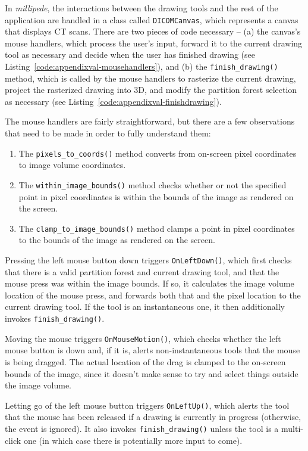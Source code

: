 In \emph{millipede}, the interactions between the drawing tools and the rest of the application are handled in a class called \texttt{DICOMCanvas}, which represents a canvas that displays CT scans. There are two pieces of code necessary -- (a) the canvas's mouse handlers, which process the user's input, forward it to the current drawing tool as necessary and decide when the user has finished drawing (see Listing~\ref{code:appendixval-mousehandlers}), and (b) the \texttt{finish_drawing()} method, which is called by the mouse handlers to rasterize the current drawing, project the rasterized drawing into 3D, and modify the partition forest selection as necessary (see Listing~\ref{code:appendixval-finishdrawing}).

The mouse handlers are fairly straightforward, but there are a few observations that need to be made in order to fully understand them:
%
\begin{enumerate}

\item The \texttt{pixels_to_coords()} method converts from on-screen pixel coordinates to image volume coordinates.
\item The \texttt{within_image_bounds()} method checks whether or not the specified point in pixel coordinates is within the bounds of the image as rendered on the screen.
\item The \texttt{clamp_to_image_bounds()} method clamps a point in pixel coordinates to the bounds of the image as rendered on the screen.

\end{enumerate}
%
Pressing the left mouse button down triggers \texttt{OnLeftDown()}, which first checks that there is a valid partition forest and current drawing tool, and that the mouse press was within the image bounds. If so, it calculates the image volume location of the mouse press, and forwards both that and the pixel location to the current drawing tool. If the tool is an instantaneous one, it then additionally invokes \texttt{finish_drawing()}.

Moving the mouse triggers \texttt{OnMouseMotion()}, which checks whether the left mouse button is down and, if it is, alerts non-instantaneous tools that the mouse is being dragged. The actual location of the drag is clamped to the on-screen bounds of the image, since it doesn't make sense to try and select things outside the image volume.

Letting go of the left mouse button triggers \texttt{OnLeftUp()}, which alerts the tool that the mouse has been released if a drawing is currently in progress (otherwise, the event is ignored). It also invokes \texttt{finish_drawing()} unless the tool is a multi-click one (in which case there is potentially more input to come).

